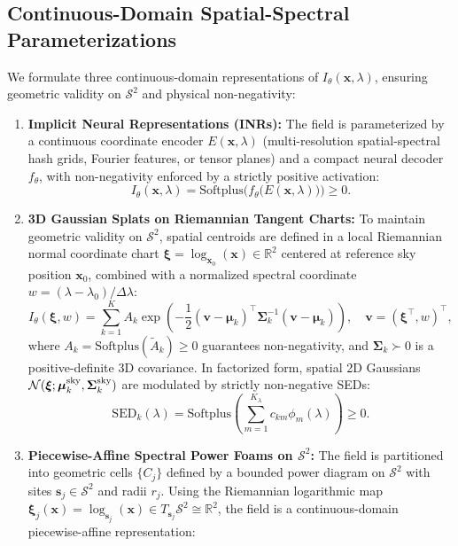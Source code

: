 \documentclass[11pt,a4paper]{article}
\begin{document}
\subsection{Continuous-Domain Spatial-Spectral Parameterizations}
\label{subsec:parameterizations}
We formulate three continuous-domain representations of $I_\theta(\boldsymbol{x}, \lambda)$, ensuring geometric validity on $\mathcal{S}^2$ and physical non-negativity:
\begin{enumerate}
    \item \textbf{Implicit Neural Representations (INRs):} The field is parameterized by a continuous coordinate encoder $E(\boldsymbol{x}, \lambda)$ (multi-resolution spatial-spectral hash grids, Fourier features, or tensor planes) and a compact neural decoder $f_\theta$, with non-negativity enforced by a strictly positive activation:
    \begin{equation}
    I_\theta(\boldsymbol{x}, \lambda) = \mathrm{Softplus}\Big( f_\theta\big( E(\boldsymbol{x}, \lambda) \big) \Big) \ge 0.
    \end{equation}
    \item \textbf{3D Gaussian Splats on Riemannian Tangent Charts:} To maintain geometric validity on $\mathcal{S}^2$, spatial centroids are defined in a local Riemannian normal coordinate chart $\boldsymbol{\xi} = \log_{\boldsymbol{x}_0}(\boldsymbol{x}) \in \mathbb{R}^2$ centered at reference sky position $\boldsymbol{x}_0$, combined with a normalized spectral coordinate $w = (\lambda - \lambda_0)/\Delta\lambda$:
    \begin{equation}
    I_\theta(\boldsymbol{\xi}, w) = \sum_{k=1}^K A_k \exp\left( -\frac{1}{2} (\boldsymbol{v} - \boldsymbol{\mu}_k)^\top \boldsymbol{\Sigma}_k^{-1} (\boldsymbol{v} - \boldsymbol{\mu}_k) \right), \quad \boldsymbol{v} = (\boldsymbol{\xi}^\top, w)^\top,
    \end{equation}
    where $A_k = \mathrm{Softplus}(\tilde{A}_k) \ge 0$ guarantees non-negativity, and $\boldsymbol{\Sigma}_k \succ 0$ is a positive-definite 3D covariance. In factorized form, spatial 2D Gaussians $\mathcal{N}(\boldsymbol{\xi}; \boldsymbol{\mu}_k^{\rm sky}, \boldsymbol{\Sigma}_k^{\rm sky})$ are modulated by strictly non-negative SEDs:
    \begin{equation}
    \mathrm{SED}_k(\lambda) = \mathrm{Softplus}\left( \sum_{m=1}^{K_\lambda} c_{km} \phi_m(\lambda) \right) \ge 0.
    \end{equation}
    \item \textbf{Piecewise-Affine Spectral Power Foams on $\mathcal{S}^2$:} The field is partitioned into geometric cells $\{C_j\}$ defined by a bounded power diagram on $\mathcal{S}^2$ with sites $\boldsymbol{s}_j \in \mathcal{S}^2$ and radii $r_j$. Using the Riemannian logarithmic map $\boldsymbol{\xi}_j(\boldsymbol{x}) = \log_{\boldsymbol{s}_j}(\boldsymbol{x}) \in T_{\boldsymbol{s}_j}\mathcal{S}^2 \cong \mathbb{R}^2$, the field is a continuous-domain piecewise-affine representation:

\end{enumerate}
\end{document}
